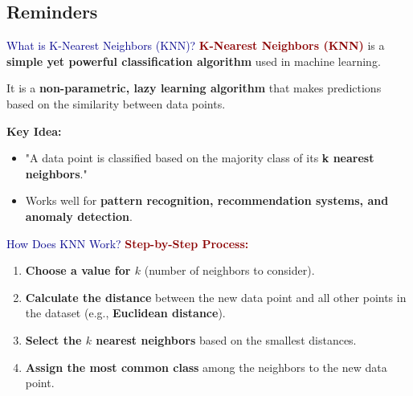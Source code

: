 \subsection{Reminders}

\begin{frame}{\textcolor{darkblue}{What is K-Nearest Neighbors (KNN)?}}
    \textbf{\textcolor{darkred}{K-Nearest Neighbors (KNN)}} is a \textbf{simple yet powerful classification algorithm} used in machine learning.
    \vspace{0.5cm}
    
    It is a \textbf{non-parametric, lazy learning algorithm} that makes predictions based on the similarity between data points.

    \textbf{Key Idea:}
    \begin{itemize}
        \item "A data point is classified based on the majority class of its \textbf{k nearest neighbors}."
        \item Works well for \textbf{pattern recognition, recommendation systems, and anomaly detection}.
    \end{itemize}
\end{frame}

\begin{frame}{\textcolor{darkblue}{How Does KNN Work?}}
    \textbf{\textcolor{darkred}{Step-by-Step Process:}}
    \begin{enumerate}
        \item \textbf{Choose a value for \( k \)} (number of neighbors to consider).
        \item  \textbf{Calculate the distance} between the new data point and all other points in the dataset (e.g., \textbf{Euclidean distance}).
        \item  \textbf{Select the \( k \) nearest neighbors} based on the smallest distances.
        \item  \textbf{Assign the most common class} among the neighbors to the new data point.
    \end{enumerate}
\end{frame}

